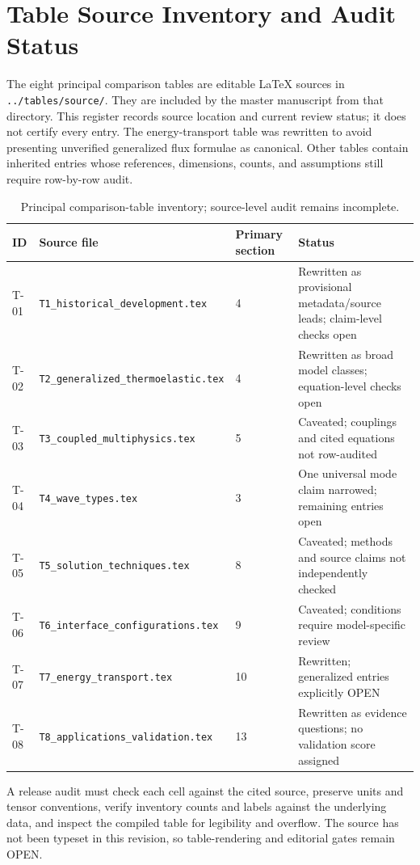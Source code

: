 \section{Table Source Inventory and Audit Status}
\label{app:tables}

The eight principal comparison tables are editable LaTeX sources in \texttt{../tables/source/}. They are included by the master manuscript from that directory. This register records source location and current review status; it does not certify every entry. The energy-transport table was rewritten to avoid presenting unverified generalized flux formulae as canonical. Other tables contain inherited entries whose references, dimensions, counts, and assumptions still require row-by-row audit.

\begin{table}[htbp]
\centering
\small
\caption{Principal comparison-table inventory; source-level audit remains incomplete.}
\label{tab:appE-tables}
\begin{tabularx}{\textwidth}{@{}p{2.2cm}X p{2.2cm}X@{}}
\toprule
\textbf{ID} & \textbf{Source file} & \textbf{Primary section} & \textbf{Status} \\
\midrule
T-01 & \texttt{T1\_\allowbreak historical\_\allowbreak development.tex} & 4 & Rewritten as provisional metadata/source leads; claim-level checks open \\
T-02 & \texttt{T2\_\allowbreak generalized\_\allowbreak thermoelastic.tex} & 4 & Rewritten as broad model classes; equation-level checks open \\
T-03 & \texttt{T3\_\allowbreak coupled\_\allowbreak multiphysics.tex} & 5 & Caveated; couplings and cited equations not row-audited \\
T-04 & \texttt{T4\_\allowbreak wave\_\allowbreak types.tex} & 3 & One universal mode claim narrowed; remaining entries open \\
T-05 & \texttt{T5\_\allowbreak solution\_\allowbreak techniques.tex} & 8 & Caveated; methods and source claims not independently checked \\
T-06 & \texttt{T6\_\allowbreak interface\_\allowbreak configurations.tex} & 9 & Caveated; conditions require model-specific review \\
T-07 & \texttt{T7\_\allowbreak energy\_\allowbreak transport.tex} & 10 & Rewritten; generalized entries explicitly OPEN \\
T-08 & \texttt{T8\_\allowbreak applications\_\allowbreak validation.tex} & 13 & Rewritten as evidence questions; no validation score assigned \\
\bottomrule
\end{tabularx}
\end{table}

A release audit must check each cell against the cited source, preserve units and tensor conventions, verify inventory counts and labels against the underlying data, and inspect the compiled table for legibility and overflow. The source has not been typeset in this revision, so table-rendering and editorial gates remain OPEN.
